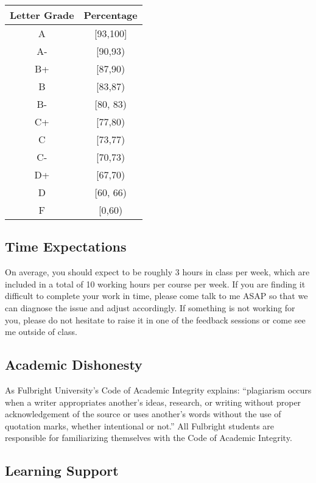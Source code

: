 \documentclass[
]{article}
\begin{document}
\begin{longtable}[]{@{}cc@{}}
\toprule\noalign{}
\textbf{Letter Grade} & \textbf{Percentage} \\
\midrule\noalign{}
\endhead
\bottomrule\noalign{}
\endlastfoot
A & {[}93,100{]} \\
A- & {[}90,93) \\
B+ & {[}87,90) \\
B & {[}83,87) \\
B- & {[}80, 83) \\
C+ & {[}77,80) \\
C & {[}73,77) \\
C- & {[}70,73) \\
D+ & {[}67,70) \\
D & {[}60, 66) \\
F & {[}0,60) \\
\end{longtable}

\subsection*{Time Expectations}\label{time-expectations}

On average, you should expect to be roughly 3 hours in class per week, which are included in a total of 10 working hours per course per week. If you are finding it difficult to complete your work in time, please come talk to me ASAP so that we can diagnose the issue and adjust accordingly. If something is not working for you, please do not hesitate to raise it in one of the feedback sessions or come see me outside of class.

\subsection*{Academic Dishonesty}\label{academic-dishonesty}

As Fulbright University's Code of Academic Integrity explains: ``plagiarism occurs when a writer appropriates another's ideas, research, or writing without proper acknowledgement of the source or uses another's words without the use of quotation marks, whether intentional or not.'' All Fulbright students are responsible for familiarizing themselves with the Code of Academic Integrity.

\subsection*{Learning Support}\label{learning-support}
\end{document}

